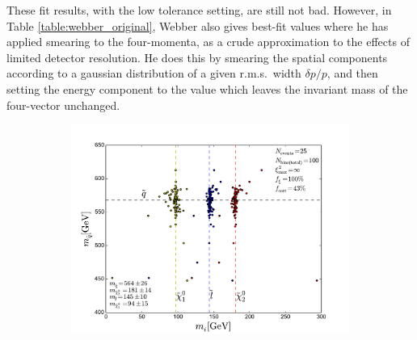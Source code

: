 \documentclass[twoside,english]{uiofysmaster}
\begin{document}
These fit results, with the low tolerance setting, are still not bad. However, in Table \ref{table:webber_original}, Webber also gives best-fit values where he has applied smearing to the four-momenta, as a crude approximation to the effects of limited detector resolution. He does this by smearing the spatial components according to a gaussian distribution of a given r.m.s.\ width $\delta p/p$, and then setting the energy component to the value which leaves the invariant mass of the four-vector unchanged.
\begin{figure}[hbtp!]
	\centering
	\begin{subfigure}[b]{0.8\textwidth}
		\includegraphics[width=\textwidth]{figures/webber_rec_table/webber_HW-rec_OFL_minuit-minimizer_hightol_5pmomsmear_nocut.pdf} 
		\caption{ }
  \label{fig:webber_rec_scatter_tolerance-comparison_5pmomsmear_a}
	\end{subfigure}


\end{figure}
\end{document}

